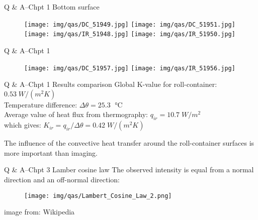 \begin{frame}{Q \& A--Chpt 1 \small{Bottom surface}}
    \begin{figure}
    \texttt{[image: img/qas/DC\_51949.jpg]}
    \texttt{[image: img/qas/DC\_51951.jpg]}\\
    \texttt{[image: img/qas/IR\_51948.jpg]}
    \texttt{[image: img/qas/IR\_51950.jpg]}
    \end{figure}

\end{frame}

\begin{frame}{Q \& A--Chpt 1}
    \begin{figure}
    \texttt{[image: img/qas/DC\_51957.jpg]}
    \texttt{[image: img/qas/IR\_51956.jpg]}

    \end{figure}

\end{frame}


\begin{frame}{Q \& A--Chpt 1 \small{Results comparison}}
Global K-value for roll-container:  $0.53\; W/(m^2 K)$\\
Temperature  difference: $\Delta \theta = 25.3 \;$ °C\\
\bigskip
Average value of heat flux from thermography: $q_{ir} = 10.7\; W/m^2$\\
which gives:
$K_{ir} = q_{ir}/\Delta \theta = 0.42\; W/(m^2 K)$

\bigskip
The influence of the convective heat transfer around the roll-container surfaces is more important than imaging.
\end{frame}

\begin{frame}{Q \& A--Chpt 3 \small{Lamber cosine law}}
The observed intensity is equal from a normal direction and an off-normal direction:
    \begin{figure}[ht]
    \centering
    \texttt{[image: img/qas/Lambert\_Cosine\_Law\_2.png]}
    \end{figure}
    \scriptsize{image from: Wikipedia}
\end{frame}




